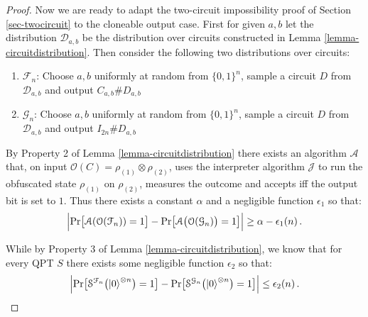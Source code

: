 \documentclass[11pt]{article}
\numberwithin{equation}{section}
\newcommand{\algo}{\mathcal}
\begin{document}
{\begin{proof}
Now we are ready to adapt the two-circuit impossibility proof of Section \ref{sec-twocircuit} to the cloneable output case.  First for given $a,b$ let the distribution $\mathcal{D}_{a,b}$ be the distribution over circuits constructed in Lemma \ref{lemma-circuitdistribution}.  Then consider the following two distributions over circuits: \begin{enumerate}
 	\item{$\mathcal{F}_{n}$: Choose $a,b$ uniformly at random from $\{0,1\}^n$,  sample a circuit $D$ from $\mathcal{D}_{a,b}$ and output $C_{a,b}\# D_{a,b}$ 
}
\item{$\mathcal{G}_{n}$: Choose $a,b$ uniformly at random from $\{0,1\}^n$,  sample a circuit $D$ from $\mathcal{D}_{a,b}$ and output $I_{2n}\# D_{a,b}$ }
 \end{enumerate}
 By Property 2 of Lemma \ref{lemma-circuitdistribution} 
 there exists an algorithm $\algo{A}$ that, on input $\mathcal{O}(C)=\rho_{(1)}\otimes\rho_{(2)}$, uses the interpreter algorithm $\algo J$ to run the obfuscated state $\rho_{(1)}$ on $\rho_{(2)}$, measures the outcome and accepts iff the output bit is set to $1$.  Thus there exists a constant $\alpha$ and a negligible function $\epsilon_1$ so that:
$$\Bigl| \text{Pr}\bigl[\mathcal A(\mathcal{O}(\mathcal{F}_n)) = 1\bigr]- \text{Pr}\bigl[\mathcal A\bigl(\mathcal{O}(\mathcal{G}_n)\bigr) = 1\bigr] \Bigr| \geq \alpha-\epsilon_1(n)\,.$$
 
 While by Property 3 of Lemma \ref{lemma-circuitdistribution}, we know that for every QPT $S$ there exists some negligible function $\epsilon_2$ so that: 
 $$\label{eqn1}\Bigl| \text{Pr}\bigl[\mathcal S^{\mathcal{F}_n}\bigl({\left\vert{0}\right\rangle}^{\otimes n}\bigr) = 1\bigr]- \text{Pr}\bigl[\mathcal S^{\mathcal{G}_n}\bigl({\left\vert{0}\right\rangle}^{\otimes n}\bigr) = 1\bigr] \Bigr| \leq \epsilon_2(n)\,.$$

  
 
\end{proof}




%
%
%


}
\end{document}
